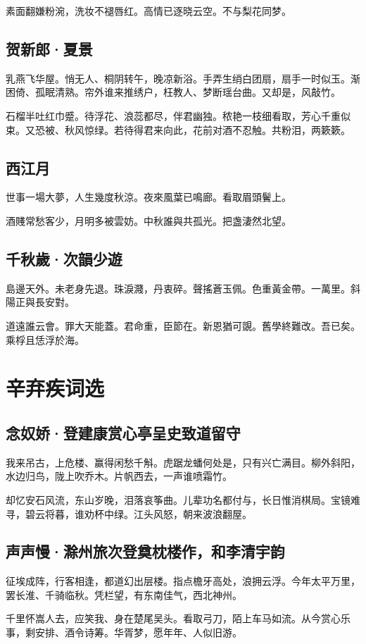 \documentclass[a5paper]{ctexart}
\begin{document}
	素面翻嫌粉涴，洗妆不褪唇红。高情已逐晓云空。不与梨花同梦。
	
	\subsection{贺新郎·夏景}
	乳燕飞华屋。悄无人、桐阴转午，晚凉新浴。手弄生绡白团扇，扇手一时似玉。渐困倚、孤眠清熟。帘外谁来推绣户，枉教人、梦断瑶台曲。又却是，风敲竹。
	
	石榴半吐红巾蹙。待浮花、浪蕊都尽，伴君幽独。秾艳一枝细看取，芳心千重似束。又恐被、秋风惊绿。若待得君来向此，花前对酒不忍触。共粉泪，两簌簌。
	
	\subsection{西江月}
	世事一場大夢，人生幾度秋涼。夜來風葉已鳴廊。看取眉頭鬢上。
	
	酒賤常愁客少，月明多被雲妨。中秋誰與共孤光。把盏淒然北望。
	
	\subsection{千秋歲·次韻少遊}
	島邊天外。未老身先退。珠淚濺，丹衷碎。聲搖蒼玉佩。色重黃金帶。一萬里。斜陽正與長安對。
	
	道遠誰云會。罪大天能蓋。君命重，臣節在。新恩猶可覬。舊學終難改。吾已矣。乘桴且恁浮於海。
	
	\newpage
	\section{辛弃疾词选}
	\subsection{念奴娇·登建康赏心亭呈史致道留守}
	我来吊古，上危楼、赢得闲愁千斛。虎踞龙蟠何处是，只有兴亡满目。柳外斜阳，水边归鸟，陇上吹乔木。片帆西去，一声谁喷霜竹。
	
	却忆安石风流，东山岁晚，泪落哀筝曲。儿辈功名都付与，长日惟消棋局。宝镜难寻，碧云将暮，谁劝杯中绿。江头风怒，朝来波浪翻屋。
	
	\subsection{声声慢·滁州旅次登奠枕楼作，和李清宇韵}
	征埃成阵，行客相逢，都道幻出层楼。指点檐牙高处，浪拥云浮。今年太平万里，罢长淮、千骑临秋。凭栏望，有东南佳气，西北神州。
	
	千里怀嵩人去，应笑我、身在楚尾吴头。看取弓刀，陌上车马如流。从今赏心乐事，剩安排、酒令诗筹。华胥梦，愿年年、人似旧游。
	
\end{document}
